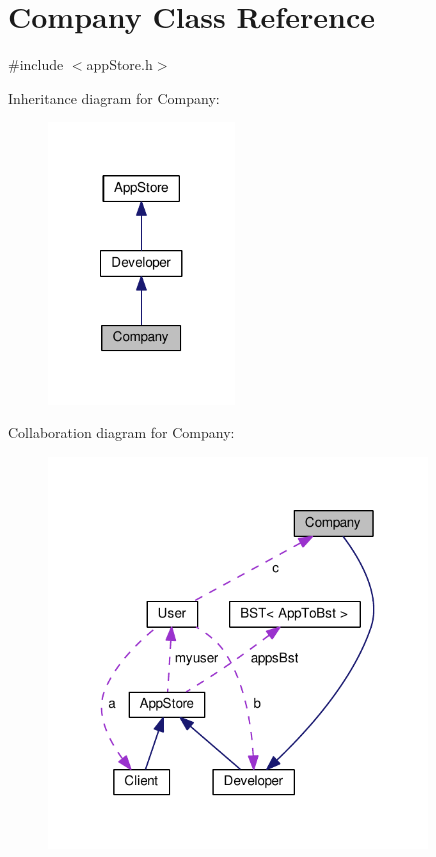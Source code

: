 \hypertarget{class_company}{\section{Company Class Reference}
\label{class_company}
}


{\ttfamily \#include $<$app\-Store.\-h$>$}



Inheritance diagram for Company\-:
\nopagebreak
\begin{figure}[H]
\begin{center}
\leavevmode
\includegraphics[width=140pt]{class_company__inherit__graph}
\end{center}
\end{figure}


Collaboration diagram for Company\-:
\nopagebreak
\begin{figure}[H]
\begin{center}
\leavevmode
\includegraphics[width=285pt]{class_company__coll__graph}
\end{center}
\end{figure}
